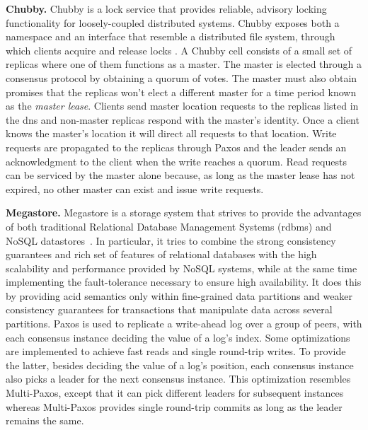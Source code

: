 \textbf{Chubby.} Chubby is a lock service that provides reliable, advisory locking functionality for loosely-coupled distributed systems. Chubby exposes both a namespace and an interface that resemble a distributed file system, through which clients acquire and release locks \cite{Burrows2006}. A Chubby cell consists of a small set of replicas where one of them functions as a master. The master is elected through a consensus protocol by obtaining a quorum of votes. The master must also obtain promises that the replicas won't elect a different master for a time period known as the \textit{master lease}. Clients send master location requests to the replicas listed in the \acrfull{dns} and non-master replicas respond with the master's identity. Once a client knows the master's location it will direct all requests to that location. Write requests are propagated to the replicas through Paxos and the leader sends an acknowledgment to the client when the write reaches a quorum. Read requests can be serviced by the master alone because, as long as the master lease has not expired, no other master can exist and issue write requests.\par
\textbf{Megastore.} Megastore is a storage system that strives to provide the advantages of both traditional Relational Database Management Systems (\acrshort{rdbms}) and NoSQL datastores~\cite{36971}. In particular, it tries to combine the strong consistency guarantees and rich set of features of relational databases with the high scalability and performance provided by NoSQL systems, while at the same time implementing the fault-tolerance necessary to ensure high availability. It does this by providing \acrfull{acid} semantics only within fine-grained data partitions and weaker consistency guarantees for transactions that manipulate data across several partitions. Paxos is used to replicate a write-ahead log over a group of peers, with each consensus instance deciding the value of a log's index. Some optimizations are implemented to achieve fast reads and single round-trip writes. To provide the latter, besides deciding the value of a log's position, each consensus instance also picks a leader for the next consensus instance. This optimization resembles Multi-Paxos, except that it can pick different leaders for subsequent instances whereas Multi-Paxos provides single round-trip commits as long as the leader remains the same. \par